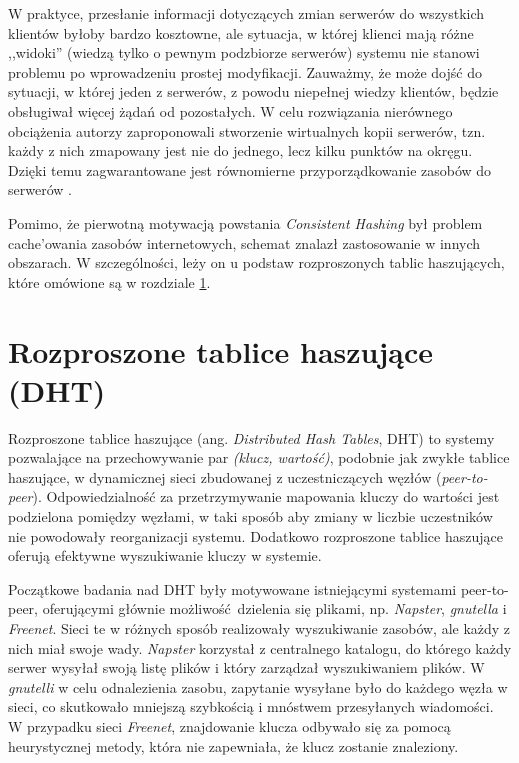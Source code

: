 \documentclass[a4paper,11pt]{scrartcl}
\newcommand{\s}{ }
\newcommand{\keszowania}{cache'owania}
\begin{document}
W praktyce, przesłanie informacji dotyczących zmian serwerów do wszystkich klientów byłoby bardzo kosztowne, ale sytuacja, w której klienci mają różne ,,widoki'' (wiedzą tylko o pewnym podzbiorze serwerów) systemu nie stanowi problemu po wprowadzeniu prostej modyfikacji. Zauważmy, że może dojść do sytuacji, w której jeden z serwerów, z powodu niepełnej wiedzy klientów, będzie obsługiwał więcej żądań od pozostałych. W celu rozwiązania nierównego obciążenia autorzy zaproponowali stworzenie wirtualnych kopii serwerów, tzn. każdy z nich zmapowany jest nie do jednego, lecz kilku punktów na okręgu. Dzięki temu zagwarantowane jest równomierne przyporządkowanie zasobów do serwerów \cite{karger1999web}.

Pomimo, że pierwotną motywacją powstania \textit{Consistent Hashing} był problem \keszowania\s zasobów internetowych, schemat znalazł zastosowanie w innych obszarach. W szczególności, leży on u podstaw rozproszonych tablic haszujących, które omówione są w rozdziale \ref{sect_dht}.

\section{Rozproszone tablice haszujące (DHT)}
\label{sect_dht}
Rozproszone tablice haszujące (ang. \textit{Distributed Hash Tables}, DHT) to systemy pozwalające na przechowywanie par \textit{(klucz, wartość)}, podobnie jak zwykłe tablice haszujące, w dynamicznej sieci zbudowanej z uczestniczących węzłów (\textit{peer-to-peer}). Odpowiedzialność za przetrzymywanie mapowania kluczy do wartości jest podzielona pomiędzy węzłami, w taki sposób aby zmiany w liczbie uczestników nie powodowały reorganizacji systemu. Dodatkowo rozproszone tablice haszujące oferują efektywne wyszukiwanie kluczy w systemie.

Początkowe badania nad DHT były motywowane istniejącymi systemami peer-to-peer, oferującymi głównie możliwość dzielenia się plikami, np. \textit{Napster}, \textit{gnutella} i \textit{Freenet}. Sieci te w różnych sposób realizowały wyszukiwanie zasobów, ale każdy z nich miał swoje wady. \textit{Napster} korzystał z centralnego katalogu, do którego każdy serwer wysyłał swoją listę plików i który zarządzał wyszukiwaniem plików. W \textit{gnutelli} w celu odnalezienia zasobu, zapytanie wysyłane było do każdego węzła w sieci, co skutkowało mniejszą szybkością i mnóstwem przesyłanych wiadomości. W przypadku sieci \textit{Freenet}, znajdowanie klucza odbywało się za pomocą heurystycznej metody, która nie zapewniała, że klucz zostanie znaleziony.
\end{document}
